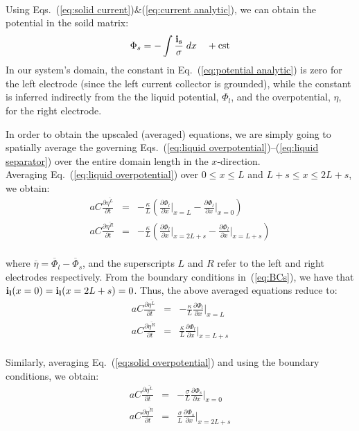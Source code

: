 \\
Using Eqs.~(\ref{eq:solid current})\&(\ref{eq:current analytic}), we can obtain the potential in the soild matrix:
\begin{equation}
\Phi_s = - \int{\frac{\bold{i_s}}{\sigma} \; dx} \quad + \text{cst}
\label{eq:potential analytic}
\end{equation}
In our system's domain, the constant in Eq.~(\ref{eq:potential analytic}) is zero for the left electrode (since the left current collector is grounded), while the constant is inferred indirectly from the the liquid potential, $\Phi_l$, and the overpotential, $\eta$, for the right electrode.


In order to obtain the upscaled (averaged) equations, we are simply going to spatially average the governing Eqs.~(\ref{eq:liquid overpotential})--(\ref{eq:liquid separator}) over the entire domain length in the $x$-direction.  
\\
Averaging Eq.~(\ref{eq:liquid overpotential}) over $0 \le x \le L$ and $L+s \le x \le  2L+s$, we obtain: \begin{eqnarray}
aC\frac{\partial \overline {\eta^{L}}}{\partial t} &=& -\frac{\kappa}{L} \left(\frac{\partial \Phi_l}{\partial x}\bigg|_{x=L} - \frac{\partial \Phi_l}{\partial x}\bigg|_{x=0}\right) \nonumber \\
aC\frac{\partial \overline {\eta^{R}}}{\partial t} &=& -\frac{\kappa}{L} \left(\frac{\partial \Phi_l}{\partial x}\bigg|_{x=2L+s} - \frac{\partial \Phi_l}{\partial x}\bigg|_{x=L+s}\right)
\end{eqnarray}
\\
where $\overline \eta = \overline \Phi_l - \overline \Phi_s$, and the superscripts $L$ and $R$ refer to the left and right electrodes respectively.
From the boundary conditions in~(\ref{eq:BCs}), we have that $\bold{i_l} (x = 0) = \bold{i_l} (x = 2L+s) = 0$. Thus, the above averaged equations reduce to:
\begin{eqnarray}
aC\frac{\partial \overline {\eta^{L}}}{\partial t} &=& -\frac{\kappa}{L} \frac{\partial \Phi_l}{\partial x}\bigg|_{x=L} \nonumber \\
aC\frac{\partial \overline {\eta^{R}}}{\partial t} &=& \frac{\kappa}{L} \frac{\partial \Phi_l}{\partial x}\bigg|_{x=L+s} 
\label{eq:averaged liquid potential}
\end{eqnarray}
\\
Similarly, averaging Eq.~(\ref{eq:solid overpotential}) and using the boundary conditions, we obtain:
\begin{eqnarray}
aC\frac{\partial \overline {\eta^{L}}}{\partial t} &=& -\frac{\sigma}{L} \frac{\partial \Phi_s}{\partial x}\bigg|_{x=0} \nonumber \\
aC\frac{\partial \overline {\eta^{R}}}{\partial t} &=& \frac{\sigma}{L} \frac{\partial \Phi_s}{\partial x}\bigg|_{x=2L+s} 
\label{eq:averaged solid potential}
\end{eqnarray}
